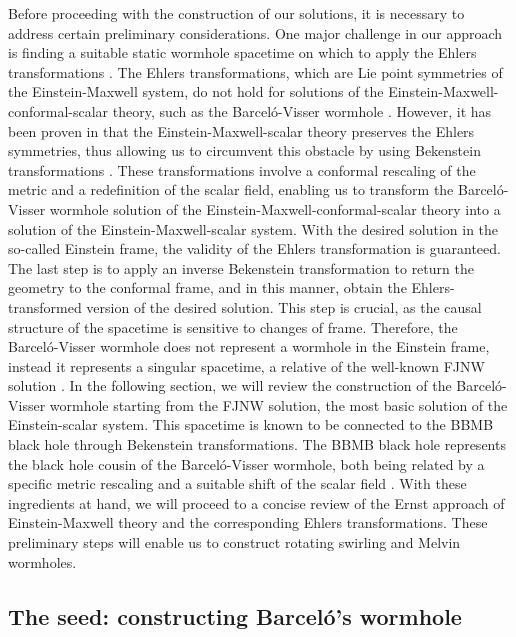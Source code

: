 \documentclass[aps,preprint,groupedaddress,nofootinbib,superscriptaddress,showkeys,showpacs,eqsecnum,amsmath,amssymb]{revtex4-1}
\begin{document}
Before proceeding with the construction of our solutions, it is necessary to address certain preliminary considerations. One major challenge in our approach is finding a suitable static wormhole spacetime on which to apply the Ehlers transformations \cite{Ehlers:1957zz,Harrison:1968}. The Ehlers transformations, which are Lie point symmetries of the Einstein-Maxwell system, do not hold for solutions of the Einstein-Maxwell-conformal-scalar theory, such as the Barcel\'o-Visser wormhole \cite{Barcelo:1999hq,Barcelo:2000zf}. However, it has been proven in \cite{Astorino:2013xc} that the Einstein-Maxwell-scalar theory preserves the Ehlers symmetries, thus allowing us to circumvent this obstacle by using Bekenstein transformations \cite{Bekenstein:1974sf}. These transformations involve a conformal rescaling of the metric and a redefinition of the scalar field, enabling us to transform the Barcel\'o-Visser wormhole solution of the Einstein-Maxwell-conformal-scalar theory into a solution of the Einstein-Maxwell-scalar system. With the desired solution in the so-called Einstein frame, the validity of the Ehlers transformation is guaranteed. The last step is to apply an inverse Bekenstein transformation to return the geometry to the conformal frame, and in this manner, obtain the Ehlers-transformed version of the desired solution. This step is crucial, as the causal structure of the spacetime is sensitive to changes of frame. Therefore, the Barcel\'o-Visser wormhole does not represent a wormhole in the Einstein frame, instead it represents a singular spacetime, a relative of the well-known FJNW solution \cite{Janis:1969ivo}. In the following section, we will review the construction of the Barcel\'o-Visser wormhole starting from the FJNW solution, the most basic solution of the Einstein-scalar system. This spacetime is known to be connected to the BBMB black hole \cite{BBMB,Bekenstein:1974sf} through Bekenstein transformations. The BBMB black hole represents the black hole cousin of the Barcel\'o-Visser wormhole, both being related by a specific metric rescaling and a suitable shift of the scalar field \cite{Ayon-Beato:2015ada}. With these ingredients at hand, we will proceed to a concise review of the Ernst approach of Einstein-Maxwell theory and the corresponding Ehlers transformations. These preliminary steps will enable us to construct rotating swirling and Melvin wormholes.

\subsection{The seed: constructing Barcel\'o's wormhole}
\end{document}
